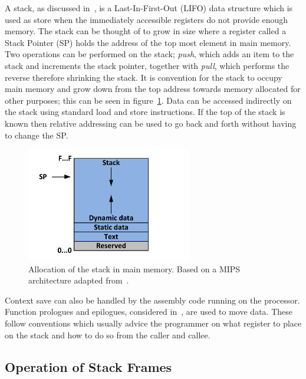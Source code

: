 \documentclass[12pt,a4paper]{article}
\begin{document}



A stack, as discussed in~\cite{stack}, is a Last-In-First-Out (LIFO) data structure which is used as store when the immediately accessible registers do not provide enough memory.
The stack can be thought of to grow in size where a register called a Stack Pointer (SP) holds the address of the top most element in main memory.
Two operations can be performed on the stack; \emph{push}, which adds an item to the stack and increments the stack pointer, together with \emph{pull}, which performs the reverse therefore shrinking the stack. 
It is convention for the stack to occupy main memory and grow down from the top address towards memory allocated for other purposes; this can be seen in figure~\ref{fig:allocation}.
Data can be accessed indirectly on the stack using standard load and store instructions. 
If the top of the stack is known then relative addressing can be used to go back and forth without having to change the SP.

\begin{figure}[htb]
   \centering
   \includegraphics[height=5cm]{Figures/allocation.pdf}
   \caption{Allocation of the stack in main memory. Based on a MIPS architecture adapted from~\cite{stack}.}
   \label{fig:allocation}
\end{figure}

Context save can also be handled by the assembly code running on the processor.
Function prologues and epilogues, considered in~\cite{proWiki,pro}, are used to move data.
These follow conventions which usually advice the programmer on what register to place on the stack and how to do so from the caller and callee.




\subsection{Operation of Stack Frames}
\end{document}
